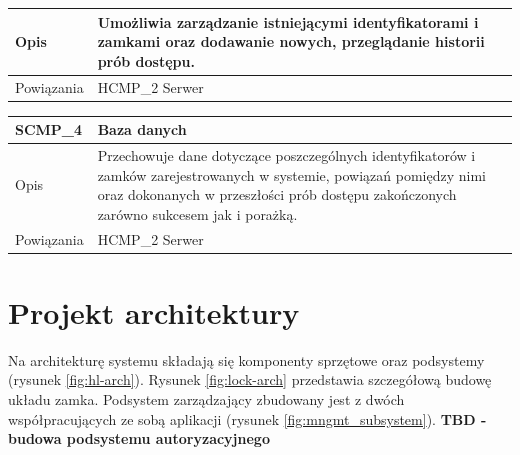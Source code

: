 \begin{table}
\begin{subtable}[c]{\textwidth}
\begin{tabular}{|p{2cm}|p{12cm}|}
                            \hline \cellcolor[gray]{0.8} Opis         & Umożliwia zarządzanie istniejącymi identyfikatorami i zamkami oraz dodawanie nowych, przeglądanie historii prób dostępu. \\
                            \hline \cellcolor[gray]{0.8} Powiązania   & HCMP\_2 Serwer    \\
                            \hline
                        \end{tabular}
                        \label{tbl:scmp3}
                        \vspace{10mm}           
                    \end{subtable}                 
                \quad%
                    \begin{subtable}[c]{\textwidth}
                        \centering
                        \begin{tabular}{|p{2cm}|p{12cm}|}
                            \hline SCMP\_4      & \textbf{Baza danych} \\
                            \hline \cellcolor[gray]{0.8} Opis         & Przechowuje dane dotyczące poszczególnych identyfikatorów i zamków zarejestrowanych w systemie, powiązań pomiędzy nimi oraz dokonanych w przeszłości prób dostępu zakończonych zarówno sukcesem jak i porażką. \\
                            \hline \cellcolor[gray]{0.8} Powiązania   & HCMP\_2 Serwer    \\
                            \hline
                        \end{tabular}
                        \label{tbl:scmp4}   
                        \vspace{10mm}       
                    \end{subtable} 
                    \label{tbl:sw_comp}
                \end{table}

        \pagebreak

        \section{Projekt architektury}

            Na architekturę systemu składają się komponenty sprzętowe oraz podsystemy (rysunek \ref{fig:hl-arch}). Rysunek \ref{fig:lock-arch} przedstawia szczegółową budowę układu zamka. Podsystem zarządzający zbudowany jest z dwóch współpracujących ze sobą aplikacji (rysunek \ref{fig:mngmt_subsystem}). \textbf{TBD - budowa podsystemu autoryzacyjnego} 

